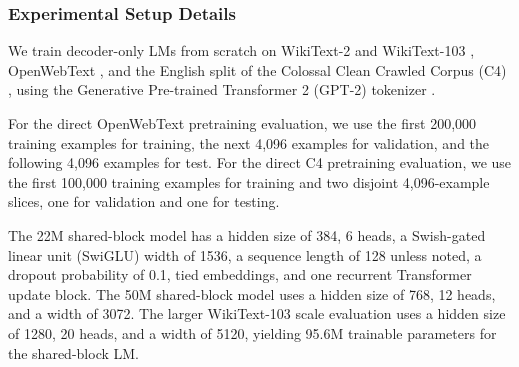 \documentclass[letterpaper]{article} %
\theoremstyle{remark}
\begin{document}
\subsubsection{Experimental Setup Details}
\label{app:experimental-setup-details}
We train decoder-only LMs from scratch on WikiText-2 and WikiText-103 \citep{merity2016wikitext}, OpenWebText \citep{gokaslan2019openwebtext}, and the English split of the Colossal Clean Crawled Corpus (C4) \citep{raffel2020t5}, using the Generative Pre-trained Transformer 2 (GPT-2) tokenizer \citep{radford2019language}.

For the direct OpenWebText pretraining evaluation, we use the first 200,000 training examples for training, the next 4,096 examples for validation, and the following 4,096 examples for test.  For the direct C4 pretraining evaluation, we use the first 100,000 training examples for training and two disjoint 4,096-example slices, one for validation and one for testing.

The 22M shared-block model has a hidden size of 384, 6 heads, a Swish-gated linear unit (SwiGLU) width of 1536, a sequence length of 128 unless noted, a dropout probability of 0.1, tied embeddings, and one recurrent Transformer update block.  The 50M shared-block model uses a hidden size of 768, 12 heads, and a width of 3072.  The larger WikiText-103 scale evaluation uses a hidden size of 1280, 20 heads, and a width of 5120, yielding 95.6M trainable parameters for the shared-block LM.
\end{document}
